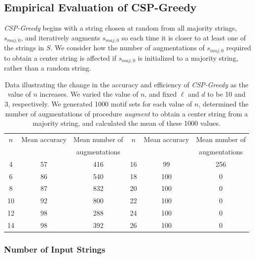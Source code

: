 \subsection{Empirical Evaluation of CSP-Greedy} 

{\em CSP-Greedy} begins with a string chosen at random from all majority strings, $s_{maj, 0}$, and iteratively augments $s_{maj, 0}$ so each time it is closer to at least one of the strings in $S$.  We consider how the number of augmentations of $s_{maj, 0}$ required to obtain a center string is affected if $s_{maj, 0}$ is initialized to a majority string, rather than a random string. 


 
\begin{table}[h!]
\begin{center} {
	\begin{tabular}{|c|c|c||c|c|c| }
     \hline	
	$n$				& Mean accuracy 			& Mean number of		 & $n$ 			& Mean accuracy			&	Mean number of  \\
						&  						& augmentations	 & 	 			& 							& augmentations \\
	\hline
    4						& 57 			& 416 	& 16				&	99 				&	256			\\
	6  					& 86 			& 540 	& 18				&	100 				& 0\\
	8		 				& 87 			& 832 	& 20				& 100 							& 0 \\
	10					& 92 			& 800 	& 22				& 	100								& 0 \\
	12					& 98 			& 288 	& 24				& 	100 								& 0 \\
	14					& 98 			& 392 	& 26				& 	100 								& 0 \\
	\hline
	\end{tabular}}
\end{center}
\caption[Data illustrating the change in the accuracy and efficiency of {\em CSP-Greedy} as the value of $n$ increases.]{Data illustrating the change in the accuracy and efficiency of {\em CSP-Greedy}  as the value of $n$ increases.  We varied the value of $n$, and fixed $\ell$ and $d$ to be 10 and 3, respectively. We generated 1000 motif sets for each value of $n$, determined the number of augmentations of procedure {\em augment} to obtain a center string from a majority string, and calculated the mean of these 1000 values.}
\label{table2}
\end{table} 

\subsubsection{Number of Input Strings}

